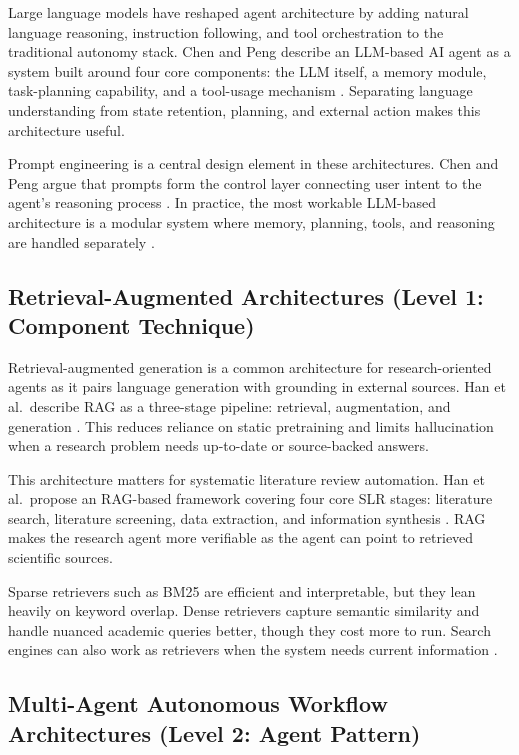 \documentclass[sn-basic,Numbered]{sn-jnl}
\begin{document}
Large language models have reshaped agent architecture by adding
natural language reasoning, instruction following, and tool
orchestration to the traditional autonomy stack. Chen and Peng
describe an LLM-based AI agent as a system built around four core
components: the LLM itself, a memory module, task-planning capability,
and a tool-usage mechanism \cite{chen2025llmagent}. Separating
language understanding from state retention, planning, and external
action makes this architecture useful.

Prompt engineering is a central design element in these
architectures. Chen and Peng argue that prompts form the control layer connecting user intent to the
agent's reasoning process \cite{chen2025llmagent}. In practice, the
most workable LLM-based architecture is a modular system where memory, planning,
tools, and reasoning are handled separately
\cite{chen2025llmagent,ishida2025conceptcodecommerce}.

\subsection{Retrieval-Augmented Architectures (Level 1: Component Technique)}
\label{sec:rag}

Retrieval-augmented generation is a common architecture for
research-oriented agents as it pairs language generation with
grounding in external sources. Han et al.\ describe RAG as a
three-stage pipeline: retrieval, augmentation, and generation
\cite{han2024ragslr}. This reduces reliance on static pretraining and
limits hallucination when a research problem needs up-to-date or
source-backed answers.

This architecture matters for systematic literature review
automation. Han et al.\ propose an RAG-based framework covering four
core SLR stages: literature search, literature screening, data
extraction, and information synthesis \cite{han2024ragslr}. RAG makes
the research agent more verifiable as the agent can point to retrieved
scientific sources.

Sparse retrievers such as BM25 are efficient and interpretable, but
they lean heavily on keyword overlap. Dense retrievers capture
semantic similarity and handle nuanced academic queries better, though
they cost more to run. Search engines can also work as retrievers when
the system needs current information \cite{han2024ragslr}.

\subsection{Multi-Agent Autonomous Workflow Architectures (Level 2: Agent Pattern)}
\label{sec:maws}
\end{document}

